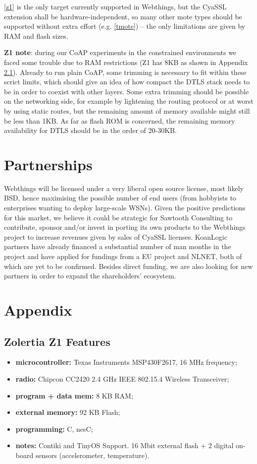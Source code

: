 \documentclass[10pt]{article}
\begin{document}
\ref{z1} is the only target currently supported in Webthings, but the CyaSSL extension shall be hardware-independent, so many other mote types should be supported without extra effort (e.g. \ref{tmote}) -- the only limitations are given by RAM and flash sizes.

\textbf{Z1 note}: during our CoAP experiments in the constrained environments we faced some trouble due to RAM restrictions (Z1 has 8KB as shown in Appendix \ref{sec:z1-feats}). Already to run plain CoAP, some trimming is necessary to fit within these scrict limits, which should give an idea of how compact the DTLS stack needs to be in order to coexist with other layers. Some extra trimming should be possible on the networking side, for example by lightening the routing protocol or at worst by using static routes, but the remaining amount of memory available might still be less than 1KB. As far as flash ROM is concerned, the remaining memory availability for DTLS should be in the order of 20-30KB.

\section{Partnerships}
Webthings will be licensed under a very liberal open source license, most likely BSD, hence maximising the possible number of end users (from hobbyists to enterprises wanting to deploy large-scale WSNs). Given the positive predictions for this market, we believe it could be strategic for Sawtooth Consulting to contribute, sponsor and/or invest in porting its own products to the Webthings project to increase revenues given by sales of CyaSSL licenses. KoanLogic partners have already financed a substantial number of man months in the project and have applied for fundings from a EU project and NLNET, both of which are yet to be confirmed. Besides direct funding, we are also looking for new partners in order to expand the shareholders' ecosystem.

\section{Appendix}

\subsection{Zolertia Z1 Features}
\label{sec:z1-feats}
\begin{itemize}
  \item \textbf{microcontroller:} Texas Instruments MSP430F2617, 16 MHz frequency;
  \item \textbf{radio:} Chipcon CC2420 2.4 GHz IEEE 802.15.4 Wireless Transceiver;
  \item \textbf{program + data mem:} 8 KB RAM;
  \item \textbf{external memory:} 92 KB Flash;
  \item \textbf{programming:} C, nesC;
  \item \textbf{notes:} Contiki and TinyOS Support. 16 Mbit external flash + 2 digital on-board sensors (accelerometer, temperature).
\end{itemize}
\end{document}
